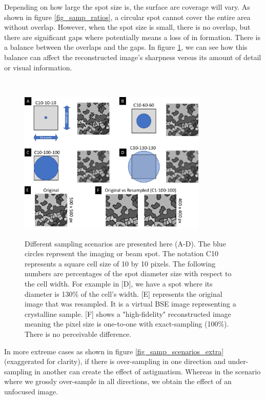 \documentclass[12pt]{article}
\begin{document}
Depending on how large the spot size is, the surface are coverage will vary. As shown in
figure \ref{fig_samp_ratios}, a circular spot cannot cover the entire area without overlap. However,
when the spot size is small, there is no overlap, but there are significant gaps where potentially 
means a loss of in formation. There is a balance between the overlaps and the gaps. 
In figure \ref{fig_samp_scenarios}, we can see how this balance can affect the reconstructed image's
sharpness versus its amount of detail or visual information.

~\newline

\begin{figure}[h!]
\begin{center}
{
 \includegraphics[width=0.8\textwidth]{figures/spot_ratio/sampling_scenarios.pdf}
}
\caption{\label{fig_samp_scenarios} Different sampling scenarios are presented here (A-D). The blue circles represent the imaging or beam spot. The notation C10 represents a square cell size of 10 by 10 pixels. The following numbers are percentages of the spot diameter size with respect to the cell width. For example in [D], we have a spot where its diameter is 130\% of the cell's width. [E] represents the original image that was resampled. It is a virtual BSE image representing a crystalline sample. [F] shows a "high-fidelity" reconstructed image meaning the pixel size is one-to-one with exact-sampling (100\%). There is no perceivable difference.}
\end{center}
\end{figure}

\newpage

In more extreme cases as shown in figure \ref{fig_samp_scenarios_extra} (exaggerated for clarity), 
if there is over-sampling in one direction and under-sampling in another can create the effect of 
astigmatism. Whereas in the scenario where we grossly over-sample in all directions, we obtain the 
effect of an unfocused image.
\end{document}
